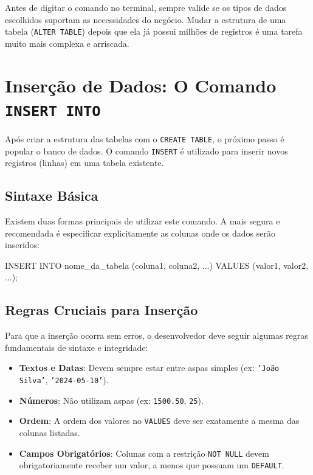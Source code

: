 \documentclass[12pt,a4paper,openright]{book}
\begin{document}
\begin{tcolorbox}[colback=blue!5,colframe=blue!40!black,title=Dica do Professor: Planejamento]
Antes de digitar o comando no terminal, sempre valide se os tipos de dados escolhidos suportam as necessidades do negócio. Mudar a estrutura de uma tabela (\texttt{ALTER TABLE}) depois que ela já possui milhões de registros é uma tarefa muito mais complexa e arriscada.
\end{tcolorbox}


\section{Inserção de Dados: O Comando \texttt{INSERT INTO}}

Após criar a estrutura das tabelas com o \texttt{CREATE TABLE}, o próximo passo é popular o banco de dados. O comando \texttt{INSERT} é utilizado para inserir novos registros (linhas) em uma tabela existente.



\subsection{Sintaxe Básica}

Existem duas formas principais de utilizar este comando. A mais segura e recomendada é especificar explicitamente as colunas onde os dados serão inseridos:

\begin{sqlcode}
INSERT INTO nome_da_tabela (coluna1, coluna2, ...)
VALUES (valor1, valor2, ...);
\end{sqlcode}

\subsection{Regras Cruciais para Inserção}

Para que a inserção ocorra sem erros, o desenvolvedor deve seguir algumas regras fundamentais de sintaxe e integridade:

\begin{itemize}
    \item \textbf{Textos e Datas}: Devem sempre estar entre aspas simples (ex: \texttt{'João Silva'}, \texttt{'2024-05-10'}).
    \item \textbf{Números}: Não utilizam aspas (ex: \texttt{1500.50}, \texttt{25}).
    \item \textbf{Ordem}: A ordem dos valores no \texttt{VALUES} deve ser exatamente a mesma das colunas listadas.
    \item \textbf{Campos Obrigatórios}: Colunas com a restrição \texttt{NOT NULL} devem obrigatoriamente receber um valor, a menos que possuam um \texttt{DEFAULT}.
\end{itemize}
\end{document}
